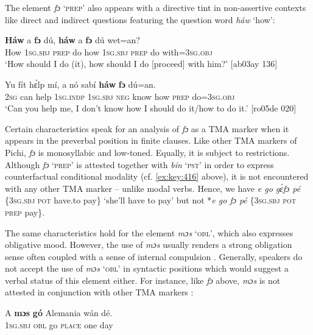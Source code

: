 The element \textit{fɔ} ‘\textsc{prep}’ also appears with a directive tint in non-assertive contexts like direct  and indirect  questions featuring the question word \textit{háw} ‘how’: 


\ea%
    \label{ex:key:419}
    \gll \textbf{Háw}  a    \textbf{fɔ} dú,  \textbf{háw}    a    \textbf{fɔ} dú  wet=an?\\
How    \textsc{1sg.sbj}  \textsc{prep}  do  how    \textsc{1sg.sbj}  \textsc{prep}  do  with=\textsc{3sg.obj}\\

\glt ‘How should I do (it), how should I do [proceed] with him?’ [ab03ay 136]
\z


\ea%
    \label{ex:key:420}
    \gll Yu  fít  hɛ́lp    mí,    a    nó  sabí    \textbf{háw}    \textbf{fɔ}  dú=an.\\
\textsc{2sg}  can  help    \textsc{1sg.indp}  \textsc{1sg.sbj}  \textsc{neg}  know  how    \textsc{prep}  do=\textsc{3sg.obj}\\

\glt ‘Can you help me, I don’t know how I should do it/how to do it.’ [ro05de 020]
\z

Certain characteristics speak for an analysis of \textit{fɔ} as a TMA marker when it appears in the preverbal position in finite clauses. Like other TMA markers of Pichi, \textit{fɔ} is monosyllabic and low-toned. Equally, it is subject to restrictions. Although \textit{fɔ} ‘\textsc{prep}’ is attested together with \textit{bin} ‘\textsc{pst}’ in order to express counterfactual conditional modality (cf. \ref{ex:key:416} above), it is not encountered with any other TMA marker – unlike modal verbs. Hence, we have \textit{e go gɛ́fɔ pé} \{\textsc{3sg.sbj} \textsc{pot} have.to pay\} ‘she’ll have to pay’ but not *\textit{e go fɔ pé} \{\textsc{3sg.sbj pot prep} pay\}. 


The same characteristics hold for the element \textit{mɔs} ‘\textsc{obl’}, which also expresses obligative mood. However, the use of \textit{mɔs} usually renders a strong obligation sense often coupled with a sense of internal compulsion . Generally, speakers do not accept the use of \textit{mɔs} ‘\textsc{obl}’ in syntactic positions which would suggest a verbal status of this element either. For instance, like \textit{fɔ} above, \textit{mɔs} is not attested in conjunction with other TMA markers : 



\ea%
    \label{ex:key:421}
    \gll \MakeUppercase{A}   \textbf{mɔs}    \textbf{gó}  Alemania  wán    dé.\\
\textsc{1sg.sbj}  \textsc{obl}    go  \textsc{place}    one    day\\


